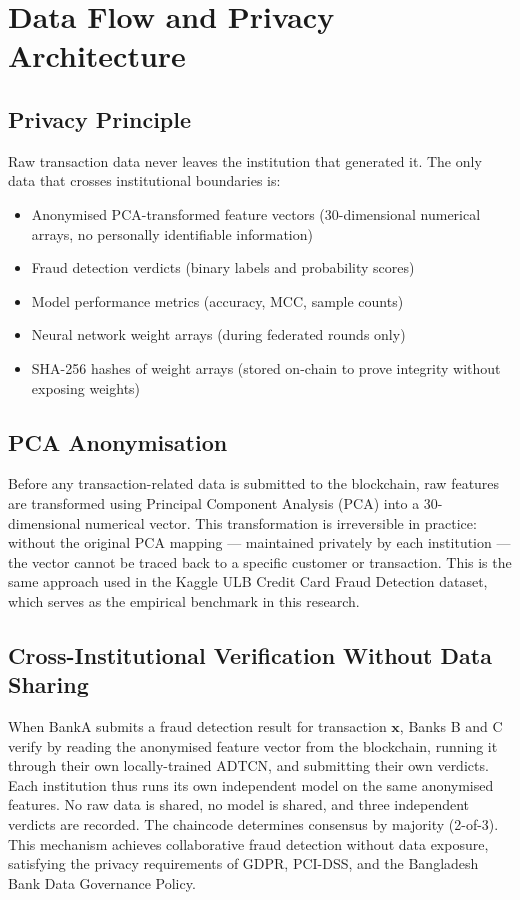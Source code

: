\section{Data Flow and Privacy Architecture}

\subsection{Privacy Principle}
Raw transaction data never leaves the institution that generated it. The only data that crosses institutional boundaries is:
\begin{itemize}
  \item Anonymised PCA-transformed feature vectors (30-dimensional numerical arrays, no personally identifiable information)
  \item Fraud detection verdicts (binary labels and probability scores)
  \item Model performance metrics (accuracy, MCC, sample counts)
  \item Neural network weight arrays (during federated rounds only)
  \item SHA-256 hashes of weight arrays (stored on-chain to prove integrity without exposing weights)
\end{itemize}

\subsection{PCA Anonymisation}

Before any transaction-related data is submitted to the blockchain, raw features are transformed using Principal Component Analysis (PCA) into a 30-dimensional numerical vector. This transformation is irreversible in practice: without the original PCA mapping — maintained privately by each institution — the vector cannot be traced back to a specific customer or transaction. This is the same approach used in the Kaggle ULB Credit Card Fraud Detection dataset, which serves as the empirical benchmark in this research.

\subsection{Cross-Institutional Verification Without Data Sharing}

When BankA submits a fraud detection result for transaction $\mathbf{x}$, Banks B and C verify by reading the anonymised feature vector from the blockchain, running it through their own locally-trained ADTCN, and submitting their own verdicts. Each institution thus runs its own independent model on the same anonymised features. No raw data is shared, no model is shared, and three independent verdicts are recorded. The chaincode determines consensus by majority (2-of-3). This mechanism achieves collaborative fraud detection without data exposure, satisfying the privacy requirements of GDPR, PCI-DSS, and the Bangladesh Bank Data Governance Policy.

